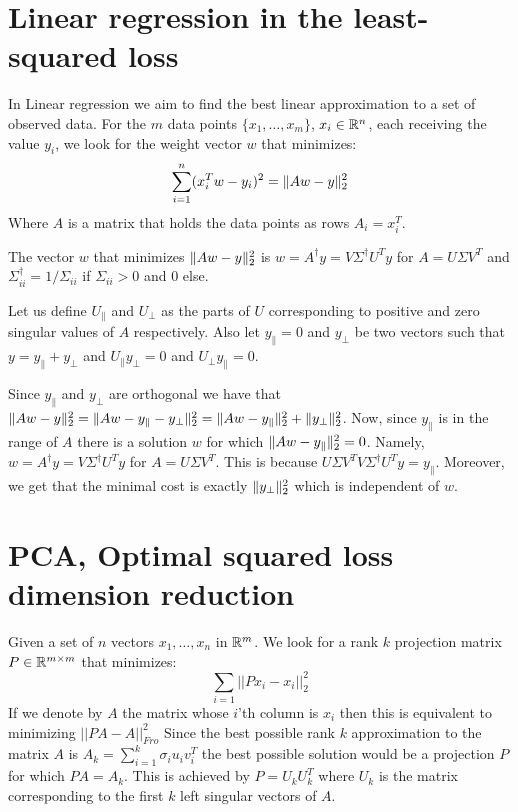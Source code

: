\documentclass{article}
\begin{document}
\section{Linear regression in the least-squared loss}
In Linear regression we aim to find the best linear approximation 
to a set of observed data. For the $m$ data  points $\{x_1,\ldots,x_m\}$,  $x_i \in {\mathbb{R}}^n$,
each receiving the value $y_i$, we look for the weight vector $w$ that minimizes:
\[
\sum_{i=1}^{n} (x_{i}^{T}w - y_i)^2 = \| Aw - y \|_{2}^{2}
\]
Where $A$ is a matrix that holds the data points as rows $A_i = x^{T}_{i}$.

\begin{proposition}
The vector $w$ that minimizes $\| Aw - y \|_{2}^{2}$ is $w = A^{\dagger}y = V\Sigma^{\dagger}U^{T}y$
for $A = U\Sigma V^T$ and $\Sigma^{\dagger}_{ii} = 1/\Sigma_{ii}$ if $\Sigma_{ii} > 0$ and $0$ else. 
\end{proposition}

Let us define $U_{\parallel}$ and $U_{\perp}$ as the parts of $U$ corresponding to positive and zero singular values of $A$ respectively. 
Also let $y_{\parallel} = 0$ and $y_{\perp}$ be two vectors such that $y = y_{\parallel}+y_{\perp}$ and 
$U_{\parallel}y_{\perp} = 0$ and $U_{\perp}y_{\parallel}=0$.

Since $y_{\parallel}$ and $y_{\perp}$ are orthogonal we have that  $\| Aw - y \|_{2}^{2}
= \| Aw - y_{\parallel}-y_{\perp} \|_{2}^{2} = \| Aw - y_{\parallel} \|_{2}^{2} + \| y_{\perp} \|_{2}^{2}$.
Now, since $y_{\parallel}$ is in the range of $A$ there is a solution $w$ for which $\| Aw - y_{\parallel} \|_{2}^{2} = 0$.
Namely, $w = A^{\dagger}y = V\Sigma^{\dagger}U^{T}y$ for $A = U\Sigma V^{T}$. This is because $U\Sigma V^{T}V\Sigma^{\dagger}U^{T}y = y_{\parallel}$.
Moreover, we get that the minimal cost is exactly $ \| y_{\perp} \|_{2}^{2}$ which is independent of $w$.


\section{PCA, Optimal squared loss dimension reduction}

Given a set of $n$ vectors $x_1,\ldots,x_n$ in ${\mathbb{R}}^{m}$. We look for a rank $k$ 
projection matrix $P \in {\mathbb{R}}^{m \times m}$ that minimizes:
\[
\sum_{i=1} ||Px_{i} - x_{i}||_{2}^{2}
\]
If we denote by $A$ the matrix whose $i$'th column is $x_i$ then this is equivalent to minimizing $||PA - A||_{Fro}^{2}$
Since the best possible rank $k$ approximation to the matrix $A$ is $A_{k} = \sum_{i=1}^{k}\sigma_{i}u_{i}v_{i}^{T}$ the best
possible solution would be a projection $P$ for which $PA = A_{k}$. This is achieved by $P = U_{k}U_{k}^{T}$ where $U_{k}$
is the matrix corresponding to the first $k$ left singular vectors of $A$. 
\end{document}
